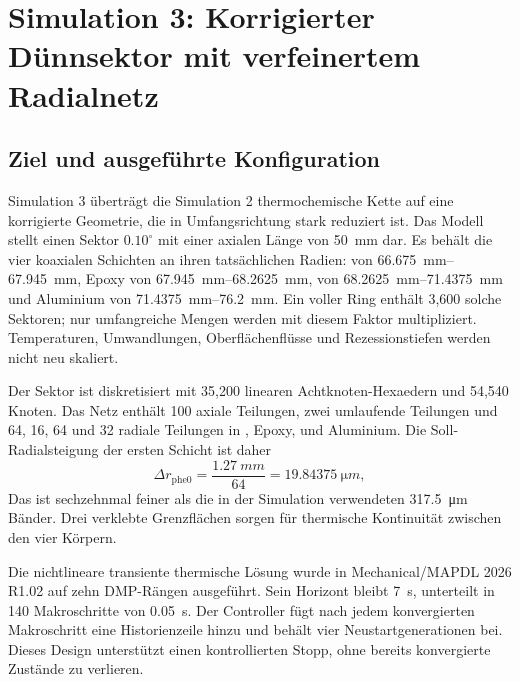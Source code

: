 \documentclass[oneside,openany]{amsdtx}
\begin{document}
\clearpage
\section{Simulation 3: Korrigierter Dünnsektor mit verfeinertem Radialnetz}

\subsection{Ziel und ausgeführte Konfiguration}

Simulation 3 überträgt die Simulation 2 thermochemische Kette auf eine korrigierte Geometrie, die in Umfangsrichtung stark reduziert ist. Das Modell stellt einen Sektor \(0.10^\circ\) mit einer axialen Länge von \SI{50}{mm} dar. Es behält die vier koaxialen Schichten an ihren tatsächlichen Radien:  von \SIrange{66.675}{67.945}{mm}, Epoxy von \SIrange{67.945}{68.2625}{mm},  von \SIrange{68.2625}{71.4375}{mm} und Aluminium von \SIrange{71.4375}{76.2}{mm}. Ein voller Ring enthält 3,600 solche Sektoren; nur umfangreiche Mengen werden mit diesem Faktor multipliziert. Temperaturen, Umwandlungen, Oberflächenflüsse und Rezessionstiefen werden nicht neu skaliert.

Der Sektor ist diskretisiert mit 35,200 linearen Achtknoten-Hexaedern und 54,540 Knoten. Das Netz enthält 100 axiale Teilungen, zwei umlaufende Teilungen und 64, 16, 64 und 32 radiale Teilungen in , Epoxy,  und Aluminium. Die Soll-Radialsteigung der ersten Schicht ist daher
\[
  \Delta r_\mathrm{phe0}=\frac{\SI{1.27}{mm}}{64}
  =\SI{19.84375}{\micro m},
\]
Das ist sechzehnmal feiner als die in der Simulation verwendeten \SI{317.5}{\micro m} Bänder. Drei verklebte Grenzflächen sorgen für thermische Kontinuität zwischen den vier Körpern.

Die nichtlineare transiente thermische Lösung wurde in Mechanical/MAPDL 2026 R1.02 auf zehn DMP-Rängen ausgeführt. Sein Horizont bleibt \SI{7}{s}, unterteilt in 140 Makroschritte von \SI{0.05}{s}. Der Controller fügt nach jedem konvergierten Makroschritt eine Historienzeile hinzu und behält vier Neustartgenerationen bei. Dieses Design unterstützt einen kontrollierten Stopp, ohne bereits konvergierte Zustände zu verlieren.
\end{document}
